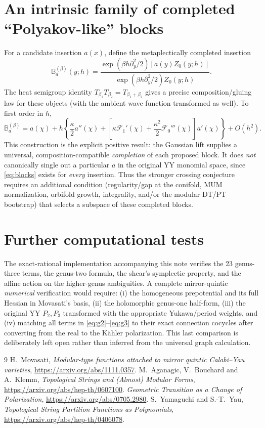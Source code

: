 \documentclass[11pt,letterpaper]{article}
\begin{document}
\section{An intrinsic family of completed ``Polyakov-like'' blocks}
For a candidate insertion $a(x)$, define the metaplectically completed insertion
\begin{equation}
\boxed{\quad\mathbb B_a^{(\beta)}(y;h)=
\frac{\exp(\beta h\partial_y^2/2)[a(y)Z_0(y;h)]}
{\exp(\beta h\partial_y^2/2)Z_0(y;h)}.\quad}\label{eq:blocks}
\end{equation}
The heat semigroup identity $T_{\beta_1}T_{\beta_2}=T_{\beta_1+\beta_2}$ gives a precise composition/gluing law for these objects (with the ambient wave function transformed as well). To first order in $h$,
\begin{equation}
\mathbb B_a^{(\beta)}=a(\chi)+h\left\{\frac{\kappa}{2}a''(\chi)
+\left[\kappa\mathcal F_1'(\chi)+\frac{\kappa^2}{2}\mathcal F_0'''(\chi)\right]a'(\chi)\right\}+O(h^2).
\end{equation}
This construction is the explicit positive result: the Gaussian lift supplies a universal, composition-compatible \emph{completion} of each proposed block. It does \emph{not} canonically single out a particular $a$ in the original YY monomial space, since \eqref{eq:blocks} exists for \emph{every} insertion. Thus the stronger crossing conjecture requires an additional condition (regularity/gap at the conifold, MUM normalization, orbifold growth, integrality, and/or the modular DT/PT bootstrap) that selects a subspace of these completed blocks.

\section{Further computational tests}
The exact-rational implementation accompanying this note verifies the 23 genus-three terms, the genus-two formula, the shear's symplectic property, and the affine action on the higher-genus ambiguities. A complete mirror-quintic \emph{numerical} verification would require: (i) the homogeneous prepotential and its full Hessian in Movasati's basis, (ii) the holomorphic genus-one half-form, (iii) the original YY $P_2,P_3$ transformed with the appropriate Yukawa/period weights, and (iv) matching all terms in \eqref{eq:g2}--\eqref{eq:g3} to their exact connection cocycles after converting from the real to the K\"ahler polarization. This last comparison is deliberately left open rather than inferred from the universal graph calculation.

\begin{thebibliography}{9}
 H.~Movasati, \emph{Modular-type functions attached to mirror quintic Calabi--Yau varieties}, \url{https://arxiv.org/abs/1111.0357}.
 M.~Aganagic, V.~Bouchard and A.~Klemm, \emph{Topological Strings and (Almost) Modular Forms}, \url{https://arxiv.org/abs/hep-th/0607100}.
 \emph{Geometric Transition as a Change of Polarization}, \url{https://arxiv.org/abs/0705.2980}.
 S.~Yamaguchi and S.-T.~Yau, \emph{Topological String Partition Functions as Polynomials}, \url{https://arxiv.org/abs/hep-th/0406078}.
\end{thebibliography}
\end{document}
